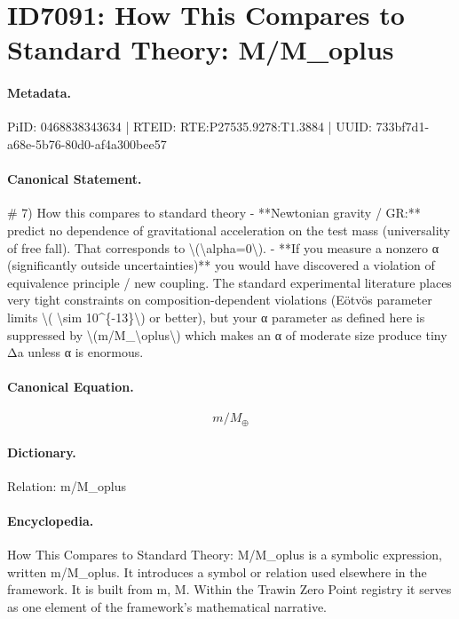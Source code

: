 \section*{ID7091: How This Compares to Standard Theory: M/M\_oplus}
\paragraph{Metadata.}
PiID: 0468838343634 | RTEID: RTE:P27535.9278:T1.3884 | UUID: 733bf7d1-a68e-5b76-80d0-af4a300bee57

\paragraph{Canonical Statement.}
\# 7) How this compares to standard theory - **Newtonian gravity / GR:** predict no dependence of gravitational acceleration on the test mass (universality of free fall). That corresponds to \textbackslash{}(\textbackslash{}alpha=0\textbackslash{}). - **If you measure a nonzero α (significantly outside uncertainties)** you would have discovered a violation of equivalence principle / new coupling. The standard experimental literature places very tight constraints on composition-dependent violations (Eötvös parameter limits \textbackslash{}( \textbackslash{}sim 10\textasciicircum{}\{-13\}\textbackslash{}) or better), but your α parameter as defined here is suppressed by \textbackslash{}(m/M\_\textbackslash{}oplus\textbackslash{}) which makes an α of moderate size produce tiny Δa unless α is enormous.

\paragraph{Canonical Equation.}
\[
m/M_\oplus
\]

\paragraph{Dictionary.}
Relation: m/M\_oplus

\paragraph{Encyclopedia.}
How This Compares to Standard Theory: M/M\_oplus is a symbolic expression, written m/M\_oplus. It introduces a symbol or relation used elsewhere in the framework. It is built from m, M. Within the Trawin Zero Point registry it serves as one element of the framework's mathematical narrative.
